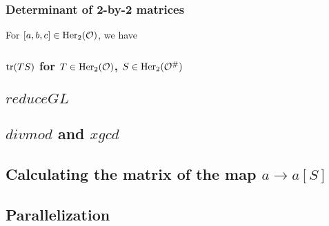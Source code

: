 \subsubsection{Determinant of 2-by-2 matrices}

For $[a,b,c] \in \operatorname{Her}_2(\mathcal{O})$, we have

\subsubsection{$\textup{\textrm{tr}}(TS)$ for $T \in \operatorname{Her}_2(\mathcal{O})$, $S \in \operatorname{Her}_2(\mathcal{O}^\#)$}


\subsection{$reduceGL$}
\label{impl:reduceGL}

\subsection{$divmod$ and $xgcd$}

\subsection{Calculating the matrix of the map $a \rightarrow a[S]$}
\label{impl:calcMatrix}

\subsection{Parallelization}
